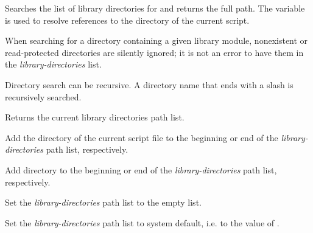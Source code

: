 \begin{desc}
  Searches the list of library directories  for
   and returns the full path. The variable 
  is used to resolve references to the directory of the current
  script. 
  
  When searching for a directory containing a given library module,
  nonexistent or read-protected directories are silently ignored; it
  is not an error to have them in the \textit{library-directories}
  list.
    
  Directory search can be recursive. A directory name that ends with a
  slash is recursively searched.
\end{desc}

\begin{desc}
  Returns the current library directories path list.
\end{desc}

\begin{desc}
  Add the directory of the current script file to the beginning or end
  of the \textit{library-directories} path list, respectively.
\end{desc}

\begin{desc}
  Add directory  to the beginning or end of the
  \textit{library-directories} path list, respectively.
\end{desc}

\begin{desc}
  Set the \textit{library-directories} path list to the empty list.
\end{desc}

\begin{desc}
  Set the \textit{library-directories} path list to system default,
  i.e. to the value of .
\end{desc}

